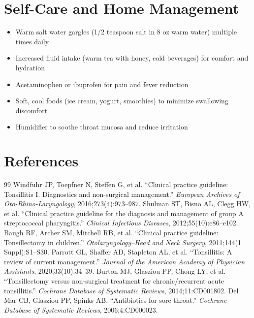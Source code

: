 \section*{Self-Care and Home Management}
\begin{itemize}
  \item Warm salt water gargles (1/2 teaspoon salt in 8 oz warm water) multiple times daily
  \item Increased fluid intake (warm tea with honey, cold beverages) for comfort and hydration
  \item Acetaminophen or ibuprofen for pain and fever reduction
  \item Soft, cool foods (ice cream, yogurt, smoothies) to minimize swallowing discomfort
  \item Humidifier to soothe throat mucosa and reduce irritation
\end{itemize}

\section*{References}
\begin{thebibliography}{99}
 Windfuhr JP, Toepfner N, Steffen G, et al. ``Clinical practice guideline: Tonsillitis I. Diagnostics and non-surgical management.'' \textit{European Archives of Oto-Rhino-Laryngology}, 2016;273(4):973--987.
 Shulman ST, Bisno AL, Clegg HW, et al. ``Clinical practice guideline for the diagnosis and management of group A streptococcal pharyngitis.'' \textit{Clinical Infectious Diseases}, 2012;55(10):e86--e102.
 Baugh RF, Archer SM, Mitchell RB, et al. ``Clinical practice guideline: Tonsillectomy in children.'' \textit{Otolaryngology--Head and Neck Surgery}, 2011;144(1 Suppl):S1--S30.
 Parrott GL, Shaffer AD, Stapleton AL, et al. ``Tonsillitis: A review of current management.'' \textit{Journal of the American Academy of Physician Assistants}, 2020;33(10):34--39.
 Burton MJ, Glasziou PP, Chong LY, et al. ``Tonsillectomy versus non-surgical treatment for chronic/recurrent acute tonsillitis.'' \textit{Cochrane Database of Systematic Reviews}, 2014;11:CD001802.
 Del Mar CB, Glasziou PP, Spinks AB. ``Antibiotics for sore throat.'' \textit{Cochrane Database of Systematic Reviews}, 2006;4:CD000023.
\end{thebibliography}
